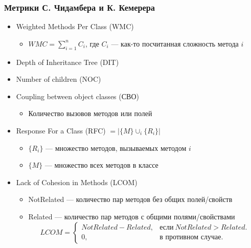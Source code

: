 \documentclass{../../slides-style}
\begin{document}
    \begin{frame}
        \frametitle{Метрики С. Чидамбера и К. Кемерера}
        \begin{itemize}
            \item Weighted Methods Per Class (WMC)
            \begin{itemize}
                \item $WMC = \sum_{i=1}^{n}C_i$, где $C_i$ --- как-то посчитанная сложность метода $i$
            \end{itemize}
            \item Depth of Inheritance Tree (DIT)
            \item Number of children (NOC)
            \item Coupling between object classes (СВО)
            \begin{itemize}
                \item Количество вызовов методов или полей
            \end{itemize}
            \item Response For a Class (RFC) $= |\{M\} \cup_{i} \{R_i\}| $
            \begin{itemize}
                \item $\{R_i\}$ --- множество методов, вызываемых методом $i$
                \item $\{M\}$ --- множество всех методов в классе
            \end{itemize}
            \item Lack of Cohesion in Methods (LCOM)
            \begin{itemize}
                \item NotRelated --- количество пар методов без общих полей/свойств
                \item Related --- количество пар методов с общими полями/свойствами
                    \begin{equation*}
                        LCOM=\begin{cases}
                            NotRelated - Related, & \text{если}\ NotRelated > Related.\\
                            0,                    & \text{в противном случае}.
                        \end{cases}
                    \end{equation*}
            \end{itemize}
        \end{itemize}
    \end{frame}
\end{document}
